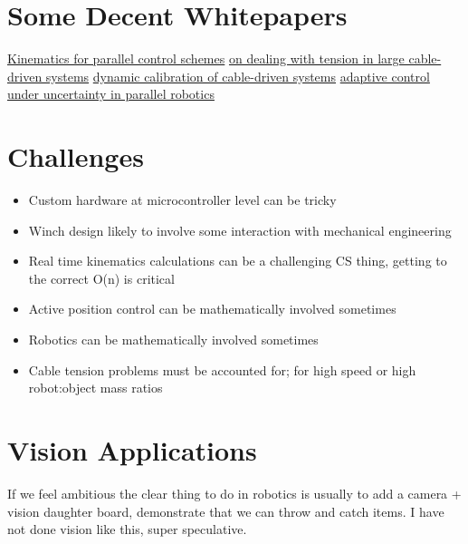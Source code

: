 \documentclass[11pt]{article}
\begin{document}
\section{Some Decent Whitepapers}
\label{sec:org309d56c}

\href{https://www.cambridge.org/core/services/aop-cambridge-core/content/view/B129C939BF4491AA693A36A54AE6D2C7/S0263574721001971a.pdf/full-dynamic-model-of-3-upu-translational-parallel-manipulator-for-model-based-control-schemes.pdf}{Kinematics for parallel control schemes}
\href{https://ieeexplore.ieee.org/stamp/stamp.jsp?arnumber=9737194}{on dealing with tension in large cable-driven systems}
\href{https://ieeexplore.ieee.org/stamp/stamp.jsp?arnumber=9737158}{dynamic calibration of cable-driven systems}
\href{https://arxiv.org/pdf/2003.08860.pdf}{adaptive control under uncertainty in parallel robotics}

\section{Challenges}
\label{sec:org8ac6786}

\begin{itemize}
\item Custom hardware at microcontroller level can be tricky
\item Winch design likely to involve some interaction with mechanical engineering
\item Real time kinematics calculations can be a challenging CS thing, getting to the correct O(n) is critical
\item Active position control can be mathematically involved sometimes
\item Robotics can be mathematically involved sometimes
\item Cable tension problems must be accounted for; for high speed or high robot:object mass ratios
\end{itemize}



\section{Vision Applications}
\label{sec:org105fe64}

If we feel ambitious the clear thing to do in robotics is usually to add a camera + vision daughter board, demonstrate that we can throw and catch items. I have not done vision like this, super speculative.
\end{document}
